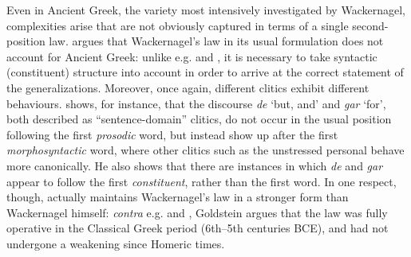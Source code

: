 Even in Ancient Greek, the variety most intensively investigated by Wackernagel, complexities arise that are not obviously captured in terms of a single second-position law. \citet{Taylor1990} argues that Wackernagel's law in its usual formulation does not account for Ancient Greek: unlike e.g. \citet{Dover1960} and \citet{Marshall1987}, it is necessary to take syntactic (constituent) structure into account in order to arrive at the correct statement of the generalizations. Moreover, once again, different clitics exhibit different behaviours. \citet[80--84]{Goldstein2016} shows, for instance, that the discourse  \textit{de} `but, and' and \textit{gar} `for', both described as ``sentence-domain'' clitics, do not occur in the usual position following the first \textit{prosodic} word, but instead show up after the first \textit{morphosyntactic} word, where other clitics such as the unstressed personal  behave more canonically. He also shows that there are instances in which \textit{de} and \textit{gar} appear to follow the first \textit{constituent}, rather than the first word. In one respect, though, \citet{Goldstein2016} actually maintains Wackernagel's law in a stronger form than Wackernagel himself: \textit{contra} e.g. \citet{Wackernagel1892} and \citet{Taylor1990}, Goldstein argues that the law was fully operative in the Classical Greek period (6th--5th centuries BCE), and had not undergone a weakening since Homeric times.

